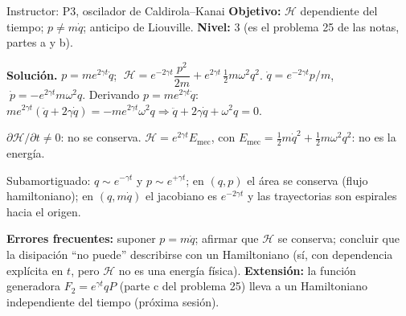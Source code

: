 \documentclass[spanish]{beamer}
\newcommand{\Ham}{\mathcal{H}}               %
\begin{document}
\begin{frame}{Instructor: P3, oscilador de Caldirola--Kanai}
\scriptsize
\textbf{Objetivo:} $\Ham$ dependiente del tiempo; $p\neq m\dot q$; anticipo de Liouville.
\textbf{Nivel:} 3 (es el problema 25 de las notas, partes a y b).

\textbf{Solución.} $p=me^{2\gamma t}\dot q$;
$\;\Ham=e^{-2\gamma t}\dfrac{p^2}{2m}+e^{2\gamma t}\,\tfrac12 m\omega^2q^2$.
$\dot q=e^{-2\gamma t}p/m$, $\;\dot p=-e^{2\gamma t}m\omega^2q$.
Derivando $p=me^{2\gamma t}\dot q$:
$me^{2\gamma t}(\ddot q+2\gamma\dot q)=-me^{2\gamma t}\omega^2q\Rightarrow\ddot q+2\gamma\dot q+\omega^2q=0$.

$\partial\Ham/\partial t\neq0$: no se conserva. $\Ham=e^{2\gamma t}E_{\mathrm{mec}}$, con
$E_{\mathrm{mec}}=\tfrac12 m\dot q^2+\tfrac12 m\omega^2q^2$: no es la energía.

Subamortiguado: $q\sim e^{-\gamma t}$ y $p\sim e^{+\gamma t}$; en $(q,p)$ el área se conserva
(flujo hamiltoniano); en $(q,m\dot q)$ el jacobiano es $e^{-2\gamma t}$ y las trayectorias
son espirales hacia el origen.

\medskip
\textbf{Errores frecuentes:} suponer $p=m\dot q$; afirmar que $\Ham$ se conserva;
concluir que la disipación “no puede” describirse con un Hamiltoniano (sí, con
dependencia explícita en $t$, pero $\Ham$ no es una energía física).
\textbf{Extensión:} la función generadora $F_2=e^{\gamma t}qP$ (parte c del problema 25)
lleva a un Hamiltoniano independiente del tiempo (próxima sesión).
\end{frame}
\end{document}
